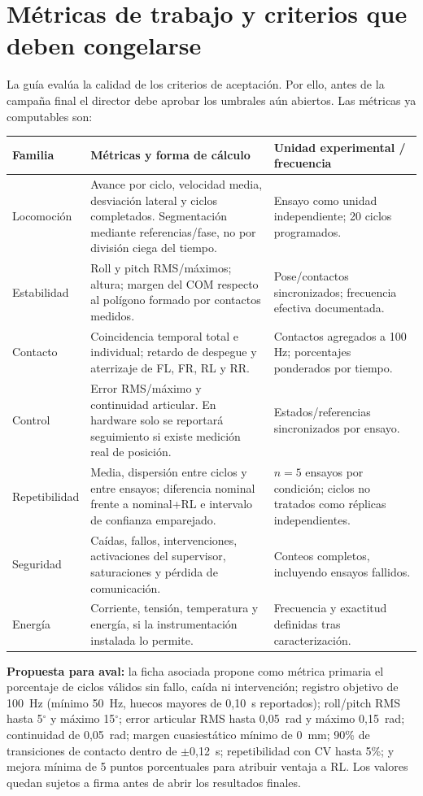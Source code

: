 \documentclass[10pt,letterpaper]{article}
\begin{document}
\section{Métricas de trabajo y criterios que deben congelarse}

La guía evalúa la calidad de los criterios de aceptación. Por ello, antes de la campaña final el director debe aprobar los umbrales aún abiertos. Las métricas ya computables son:

\begin{longtable}{p{4.0cm}p{7.0cm}p{4.0cm}}
\toprule
\textbf{Familia} & \textbf{Métricas y forma de cálculo} & \textbf{Unidad experimental / frecuencia}\\
\midrule
\endhead
Locomoción & Avance por ciclo, velocidad media, desviación lateral y ciclos completados. Segmentación mediante referencias/fase, no por división ciega del tiempo. & Ensayo como unidad independiente; 20 ciclos programados.\\
Estabilidad & Roll y pitch RMS/máximos; altura; margen del COM respecto al polígono formado por contactos medidos. & Pose/contactos sincronizados; frecuencia efectiva documentada.\\
Contacto & Coincidencia temporal total e individual; retardo de despegue y aterrizaje de FL, FR, RL y RR. & Contactos agregados a 100 Hz; porcentajes ponderados por tiempo.\\
Control & Error RMS/máximo y continuidad articular. En hardware solo se reportará seguimiento si existe medición real de posición. & Estados/referencias sincronizados por ensayo.\\
Repetibilidad & Media, dispersión entre ciclos y entre ensayos; diferencia nominal frente a nominal+RL e intervalo de confianza emparejado. & $n=5$ ensayos por condición; ciclos no tratados como réplicas independientes.\\
Seguridad & Caídas, fallos, intervenciones, activaciones del supervisor, saturaciones y pérdida de comunicación. & Conteos completos, incluyendo ensayos fallidos.\\
Energía & Corriente, tensión, temperatura y energía, si la instrumentación instalada lo permite. & Frecuencia y exactitud definidas tras caracterización.\\
\bottomrule
\end{longtable}

\textbf{Propuesta para aval:} la ficha asociada propone como métrica primaria el porcentaje de ciclos válidos sin fallo, caída ni intervención; registro objetivo de 100~Hz (mínimo 50~Hz, huecos mayores de 0,10~s reportados); roll/pitch RMS hasta 5$^{\circ}$ y máximo 15$^{\circ}$; error articular RMS hasta 0,05~rad y máximo 0,15~rad; continuidad de 0,05~rad; margen cuasiestático mínimo de 0~mm; 90\% de transiciones de contacto dentro de $\pm$0,12~s; repetibilidad con CV hasta 5\%; y mejora mínima de 5 puntos porcentuales para atribuir ventaja a RL. Los valores quedan sujetos a firma antes de abrir los resultados finales.
\end{document}
